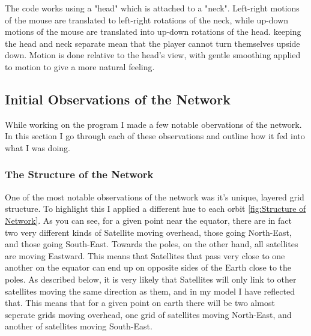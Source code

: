 \documentclass[12pt]{article}
\begin{document}
The code works using a "head" which is attached to a "neck". Left-right motions of the mouse are translated to left-right rotations of the neck, while up-down motions of the mouse are translated into up-down rotations of the head. keeping the head and neck separate mean that the player cannot turn themselves upside down. Motion is done relative to the head's view, with gentle smoothing applied to motion to give a more natural feeling.

\subsection{Initial Observations of the Network}

While working on the program I made a few notable obervations of the network. In this section I go through each of these observations and outline how it fed into what I was doing.

\subsubsection{The Structure of the Network}

One of the most notable observations of the network was it's unique, layered grid structure. To highlight this I applied a different hue to each orbit \ref{fig:Structure of Network}. As you can see, for a given point near the equator, there are in fact two very different kinds of Satellite moving overhead, those going North-East, and those going South-East. Towards the poles, on the other hand, all satellites are moving Eastward. This means that Satellites that pass very close to one another on the equator can end up on opposite sides of the Earth close to the poles. As described below, it is very likely that Satellites will only link to other satellites moving the same direction as them, and in my model I have reflected that. This means that for a given point on earth there will be two almost seperate grids moving overhead, one grid of satellites moving North-East, and another of satellites moving South-East.
\end{document}
